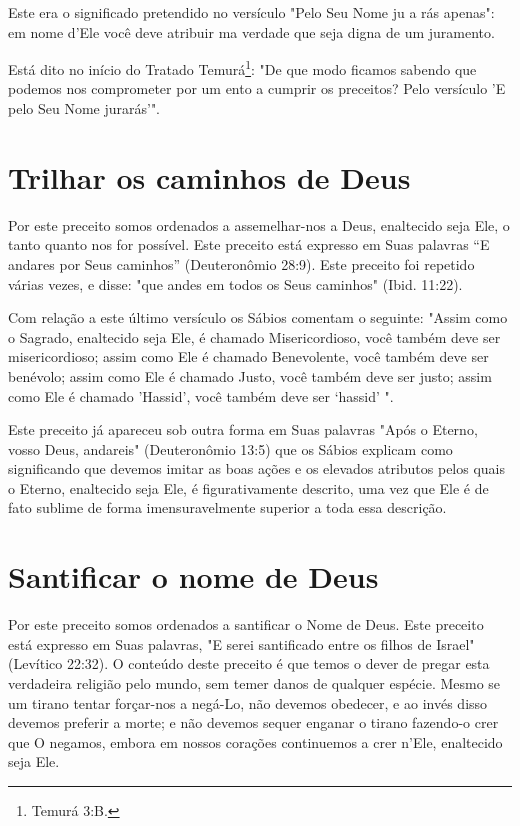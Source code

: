Este era o significado pretendido no versículo "Pelo Seu Nome ju a­ rás
apenas": em nome d'Ele você deve atribuir ma verdade que seja digna de
um juramento.

Está dito no início do Tratado Temurá\footnote{Temurá 3:B.}: "De que modo ficamos sabendo que podemos nos comprometer por um ento a cumprir os preceitos? Pelo versículo 'E pelo Seu Nome jurarás'".

\section{Trilhar os caminhos de Deus}

Por este preceito somos ordenados a assemelhar-nos a Deus, enalte­cido
seja Ele, o tanto quanto nos for possível. Este preceito está expresso
em Suas palavras ``E andares por Seus caminhos'' (Deuteronômio 28:9). Este
preceito foi repetido várias vezes, e disse: "que andes em todos os Seus
caminhos" (Ibid. 11:22).

Com relação a este último versículo os Sábios comentam o seguinte:
"Assim como o Sagrado, enaltecido seja Ele, é chamado Misericordioso,
você também deve ser misericordioso; assim como Ele é chamado
Benevolente, vo­cê também deve ser benévolo; assim como Ele é chamado
Justo, você também deve ser justo; assim como Ele é chamado 'Hassid',
você também deve ser `hassid' ".

Este preceito já apareceu sob outra forma em Suas palavras "Após o
Eterno, vosso Deus, andareis" (Deuteronômio 13:5) que os Sábios explicam
como significando que devemos imitar as boas ações e os elevados
atributos pelos quais o Eterno, enaltecido seja Ele, é figurativamente
descrito, uma vez que Ele é de fato sublime de forma imensuravelmente
superior a toda essa descrição.


\section{Santificar o nome de Deus}


Por este preceito somos ordenados a santificar o Nome de Deus. Es­te
preceito está expresso em Suas palavras, "E serei santificado entre os
filhos de Israel" (Levítico 22:32). O conteúdo deste preceito é que
temos o dever de pregar esta verdadeira religião pelo mundo, sem temer
danos de qualquer es­pécie. Mesmo se um tirano tentar forçar-nos a
negá-Lo, não devemos obede­cer, e ao invés disso devemos preferir a
morte; e não devemos sequer enganar o tirano fazendo-o crer que O
negamos, embora em nossos corações continue­mos a crer n'Ele, enaltecido
seja Ele.

